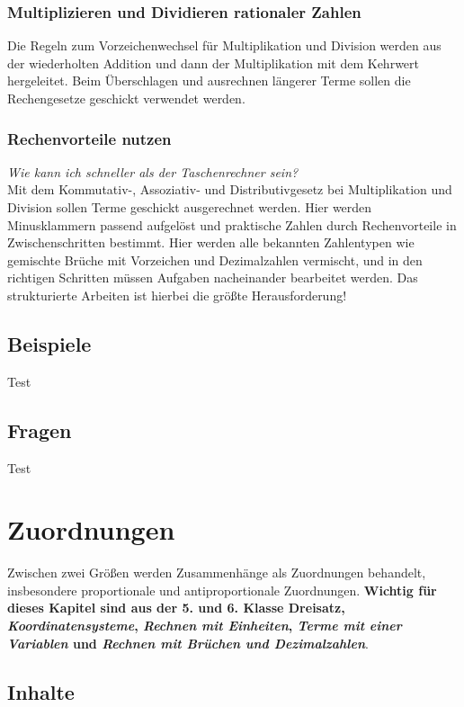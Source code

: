 \documentclass{article}
\begin{document}
\subsubsection*{Multiplizieren und Dividieren rationaler Zahlen}
Die Regeln zum Vorzeichenwechsel für Multiplikation und Division werden aus der wiederholten Addition und dann der Multiplikation mit dem Kehrwert hergeleitet.
Beim Überschlagen und ausrechnen längerer Terme sollen die Rechengesetze geschickt verwendet werden.
\subsubsection*{Rechenvorteile nutzen}
\textit{Wie kann ich schneller als der Taschenrechner sein?}\\
Mit dem Kommutativ-, Assoziativ- und Distributivgesetz bei Multiplikation und Division sollen Terme geschickt ausgerechnet werden.
Hier werden Minusklammern passend aufgelöst und praktische Zahlen durch Rechenvorteile in Zwischenschritten bestimmt.
Hier werden alle bekannten Zahlentypen wie gemischte Brüche mit Vorzeichen und Dezimalzahlen vermischt, und in den richtigen Schritten müssen Aufgaben nacheinander bearbeitet werden.
Das strukturierte Arbeiten ist hierbei die größte Herausforderung!
\subsection{Beispiele}
\begin{tcolorbox}[colback=gray!5!white,colframe=gray!25!black]
Test
\end{tcolorbox}
\subsection{Fragen}
\begin{tcolorbox}[colback=blue!5!white,colframe=blue!25!black]
Test
\end{tcolorbox}
\newpage

\section{Zuordnungen}
Zwischen zwei Größen werden Zusammenhänge als Zuordnungen behandelt, insbesondere proportionale und antiproportionale Zuordnungen.
\textbf{Wichtig für dieses Kapitel sind aus der 5. und 6. Klasse {Dreisatz}, \textit{Koordinatensysteme}, \textit{Rechnen mit Einheiten}, \textit{Terme mit einer Variablen} und \textit{Rechnen mit Brüchen und Dezimalzahlen}}.
\subsection{Inhalte}
\end{document}
